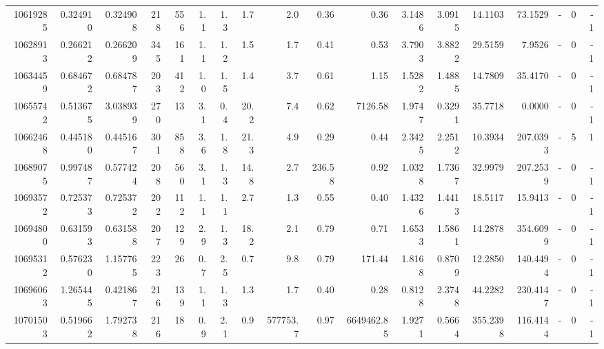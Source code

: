 \begin{tabular}{rrrrrrrrrrrrrrrlrr}
  10619285 & 0.324910 &   0.324908 &  218 &  556 &      1.1 &      1.3 &     1.7 &      2.0 &       0.36 &        0.36 &  3.1486 &  3.0915 &   14.1103 &   73.1529 &             - &        0 &         -1 \\
  10628913 & 0.266212 &   0.266209 &  345 &  161 &      1.1 &      1.2 &     1.5 &      1.7 &       0.41 &        0.53 &  3.7903 &  3.8822 &   29.5159 &    7.9526 &             - &        0 &         -1 \\
  10634459 & 0.684672 &   0.684787 &  203 &  412 &      1.0 &      1.5 &     1.4 &      3.7 &       0.61 &        1.15 &  1.5282 &  1.4885 &   14.7809 &   35.4170 &             - &        0 &         -1 \\
  10655742 & 0.513675 &   3.038939 &  270 &   13 &      3.1 &      0.4 &    20.2 &      7.4 &       0.62 &     7126.58 &  1.9747 &  0.3291 &   35.7718 &    0.0000 &             - &        0 &         -1 \\
  10662468 & 0.445180 &   0.445167 &  301 &  858 &      3.6 &      1.8 &    21.3 &      4.9 &       0.29 &        0.44 &  2.3425 &  2.2512 &   10.3934 &  207.0393 &             - &        5 &          1 \\
  10689075 & 0.997487 &   0.577424 &  208 &  560 &      3.1 &      1.3 &    14.8 &      2.7 &     236.58 &        0.92 &  1.0328 &  1.7367 &   32.9979 &  207.2539 &             - &        0 &         -1 \\
  10693572 & 0.725373 &   0.725372 &  202 &  112 &      1.1 &      1.1 &     2.7 &      1.3 &       0.55 &        0.40 &  1.4326 &  1.4413 &   18.5117 &   15.9413 &             - &        0 &         -1 \\
  10694800 & 0.631593 &   0.631588 &  207 &  129 &      2.9 &      1.3 &    18.2 &      2.1 &       0.79 &        0.71 &  1.6533 &  1.5861 &   14.2878 &  354.6099 &             - &        0 &         -1 \\
  10695312 & 0.576230 &   1.157765 &  223 &   26 &      0.7 &      2.5 &     0.7 &      9.8 &       0.79 &      171.44 &  1.8168 &  0.8709 &   12.2850 &  140.4494 &             - &        0 &         -1 \\
  10696063 & 1.265445 &   0.421867 &  216 &  139 &      1.1 &      1.3 &     1.3 &      1.7 &       0.40 &        0.28 &  0.8128 &  2.3748 &   44.2282 &  230.4147 &             - &        0 &         -1 \\
  10701503 & 0.519662 &   1.792738 &  216 &   18 &      0.9 &      2.1 &     0.9 & 577753.7 &       0.97 &  6649462.85 &  1.9271 &  0.5664 &  355.2398 &  116.4144 &             - &        0 &         -1 \\

\end{tabular}
